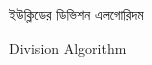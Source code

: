 \documentclass[a4paper,12pt]{article}
\begin{document}
ইউক্লিডের ডিভিশন এলগোরিদম\\

\begin{theorem}
Division Algorithm
\end{theorem}
\end{document}

